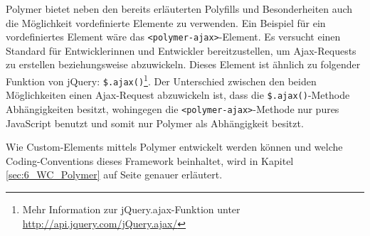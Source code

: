 Polymer bietet neben den bereits erläuterten Polyfills und Besonderheiten auch die Möglichkeit vordefinierte Elemente zu verwenden. Ein Beispiel für ein vordefiniertes Element wäre das \lstinline|<polymer-ajax>|-Element. Es versucht einen Standard für Entwicklerinnen und Entwickler bereitzustellen, um Ajax-Requests zu erstellen beziehungsweise abzuwickeln. Dieses Element ist ähnlich zu folgender Funktion von jQuery: \lstinline{$.ajax()}\footnote{Mehr Information zur jQuery.ajax-Funktion unter \href{http://api.jquery.com/jQuery.ajax/}{http://api.jquery.com/jQuery.ajax/}}. Der Unterschied zwischen den beiden Möglichkeiten einen Ajax-Request abzuwickeln ist, dass die \lstinline{$.ajax()}-Methode Abhängigkeiten besitzt, wohingegen die \lstinline|<polymer-ajax>|-Methode nur pures JavaScript benutzt und somit nur Polymer als Abhängigkeit besitzt.

Wie Custom-Elements mittels Polymer entwickelt werden können und welche Coding-Conventions dieses Framework beinhaltet, wird in Kapitel \ref{sec:6_WC_Polymer} auf Seite \pageref{sec:6_WC_Polymer} genauer erläutert.

